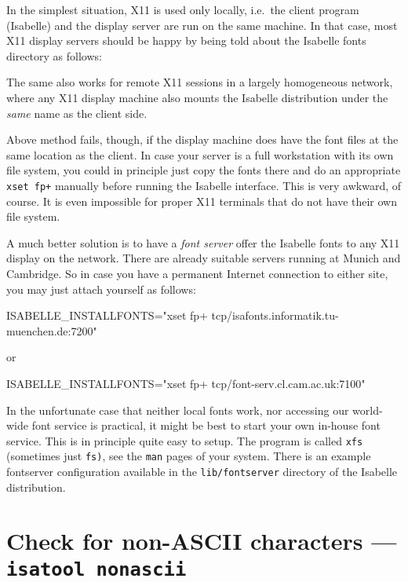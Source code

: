 \medskip In the simplest situation, X11 is used only locally, i.e.\ the client
program (Isabelle) and the display server are run on the same machine. In that
case, most X11 display servers should be happy by being told about the
Isabelle fonts directory as follows:
The same also works for remote X11 sessions in a largely homogeneous network,
where any X11 display machine also mounts the Isabelle distribution under the
\emph{same} name as the client side.

\medskip Above method fails, though, if the display machine does have the font
files at the same location as the client. In case your server is a full
workstation with its own file system, you could in principle just copy the
fonts there and do an appropriate \texttt{xset~fp+} manually before running
the Isabelle interface. This is very awkward, of course. It is even impossible
for proper X11 terminals that do not have their own file system.

A much better solution is to have a \emph{font server} offer the Isabelle
fonts to any X11 display on the network.  There are already suitable servers
running at Munich and Cambridge. So in case you have a permanent Internet
connection to either site, you may just attach yourself as follows:
\begin{ttbox}
ISABELLE_INSTALLFONTS="xset fp+ tcp/isafonts.informatik.tu-muenchen.de:7200"
\end{ttbox}
or
\begin{ttbox}
ISABELLE_INSTALLFONTS="xset fp+ tcp/font-serv.cl.cam.ac.uk:7100"
\end{ttbox}

\medskip In the unfortunate case that neither local fonts work, nor accessing
our world-wide font service is practical, it might be best to start your own
in-house font service. This is in principle quite easy to setup. The program
is called \texttt{xfs} (sometimes just \texttt{fs)}, see the \texttt{man}
pages of your system. There is an example fontserver configuration available
in the \texttt{lib/fontserver} directory of the Isabelle distribution.


\section{Check for non-ASCII characters --- \texttt{isatool nonascii}}
\label{sec:tool-nonascii}

